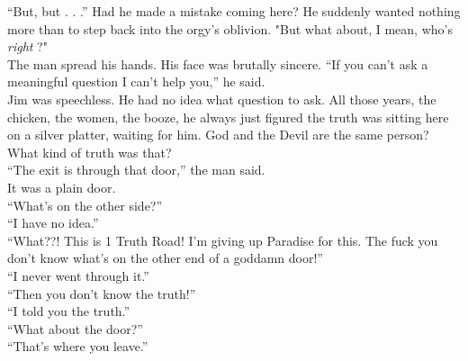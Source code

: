 \enquote{But, but . . .}  Had he made a mistake coming here?  He suddenly wanted nothing more than to step back into the orgy's oblivion.  "But what about, I mean, who's \textit{right}
?"\\



The man spread his hands.  His face was brutally sincere.  \enquote{If you can't ask a meaningful question I can't help you,} he said.\\



Jim was speechless.  He had no idea what question to ask.  All those years, the chicken, the women, the booze, he always just figured the truth was sitting here on a silver platter, waiting for him.  God and the Devil are the same person?  What kind of truth was that?\\



\enquote{The exit is through that door,} the man said.\\



It was a plain door.\\



\enquote{What's on the other side?}\\



\enquote{I have no idea.}\\



\enquote{What??!  This is 1 Truth Road!  I'm giving up Paradise for this.  The fuck you don't know what's on the other end of a goddamn door!}\\



\enquote{I never went through it.}\\



\enquote{Then you don't know the truth!}\\



\enquote{I told you the truth.}\\



\enquote{What about the door?}\\



\enquote{That's where you leave.}\\



